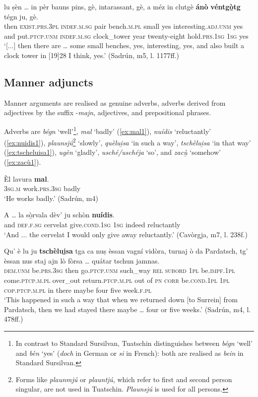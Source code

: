 \ea
\label{ano}
\gll  [...] lu ṣèn … in pèr bauns pins, gè, intarassant, gè, a méz in clutgè \textbf{ánò} \textbf{véntgò̱tg} tégn ju, gè.\\
then \textsc{exist.prs.3pl} {} \textsc{indef.m.sg} pair bench.\textsc{m.pl} small yes interesting.\textsc{adj.unm} yes and put.\textsc{ptcp.unm} \textsc{indef.m.sg} clock\_tower year twenty-eight hold.\textsc{prs.1sg} \textsc{1sg} yes \\
\glt `[...] then there are … some small benches, yes, interesting, yes, and also built a clock tower in [19]28 I think, yes.' (Sadrún, m5, l. 1177ff.)
\z

\subsection{Manner adjuncts}
Manner arguments are realised as genuine adverbs, adverbs derived from adjectives by the suffix -\textit{majn}, adjectives, and prepositional phrases.

Adverbs are \textit{bégn} `well'\footnote{In contrast to Standard Sursilvan, Tuatschin distinguishes between \textit{bégn} `well' and \textit{bèn} `yes' (\textit{doch} in German or \textit{si} in French): both are realised as \textit{bein} in Standard Sursilvan.}, \textit{mal} `badly' (\ref{ex:mal1}), \textit{nuídis} `reluctantly' (\ref{ex:nuidis1}), \textit{plaunsjú}\footnote{Forms like \textit{plaunmjú} or \textit{plauntjú}, which refer to first and second person singular, are not used in Tuatschin. \textit{Plaunsjú} is used for all persons.} `slowly', \textit{quèlui̱sa} `in such a way', \textit{tschèlui̱sa} `in that way' (\ref{ex:tscheluisa1}), \textit{ugèn} `gladly', \textit{usché/uschéja} `so', and \textit{zacù̱} `somehow' (\ref{ex:zacù1}).

\ea
\label{ex:mal1}
\gll Èl lavura \textbf{mal}.\\
\textsc{3sg.m} work.\textsc{prs.3sg} badly\\
\glt `He works badly.' (Sadrún, m4)
\z

\ea
\label{ex:nuidis1}
\gll A … la sò̱rvala dèv’ ju schòn \textbf{nuídis}.    \\
and {} \textsc{def.f.sg} cervelat give.\textsc{cond.1sg} \textsc{1sg} indeed reluctantly\\
\glt `And ... the cervelat I would only give away reluctantly.' (Cavòrgja, m7, l. 238f.)
\z

\ea
\label{ex:tscheluisa1}
\gll  Qu' è lu ju \textbf{tschèlui̱sa} tga ca nuṣ èssan vagní vidòra, turnaj ò da Pardatsch, tg' èssan nus staj ajn lò fòrsa … quátar tschun jamnas.  \\
\textsc{dem.unm} be.\textsc{prs.3sg} then go.\textsc{ptcp.unm} such\_way \textsc{rel} \textsc{subord} \textsc{1pl} be.\textsc{impf.1pl} come.\textsc{ptcp.m.pl} over\_out return.\textsc{ptcp.m.pl} out of \textsc{pn} \textsc{corr} be.\textsc{cond.1pl} \textsc{1pl} \textsc{cop.ptcp.m.pl} in there maybe {} four five week.\textsc{f.pl}   \\
\glt `This happened in such a way that when we returned down [to Surrein] from Pardatsch, then we had stayed there maybe … four or five weeks.' (Sadrún, m4, l. 478ff.)
\z

